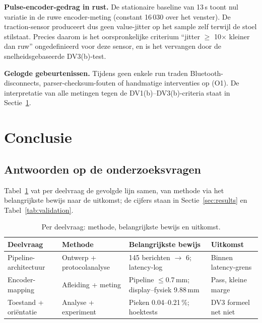 \documentclass[10pt, a4paper, twocolumn]{article}
\begin{document}
\textbf{Pulse-encoder-gedrag in rust.} De stationaire baseline van 13\,s toont
nul variatie in de ruwe encoder-meting (constant 16\,030 over het venster). De
traction-sensor produceert dus geen value-jitter op het sample zelf terwijl de
stoel stilstaat. Precies daarom is het oorspronkelijke criterium ``jitter
$\geq$ 10$\times$ kleiner dan ruw'' ongedefinieerd voor deze sensor, en is het
vervangen door de snelheidsgebaseerde DV3(b)-test.

\textbf{Gelogde gebeurtenissen.} Tijdens geen enkele run traden
Bluetooth-disconnects, parser-checksum-fouten of handmatige interventies op (O1).
De interpretatie van alle metingen tegen de DV1(b)--DV3(b)-criteria staat in
Sectie~\ref{sec:conclusion}.

\section{Conclusie}
\label{sec:conclusion}

\subsection{Antwoorden op de onderzoeksvragen}

Tabel~\ref{tab:traceability} vat per deelvraag de gevolgde lijn samen, van
methode via het belangrijkste bewijs naar de uitkomst; de cijfers staan in
Sectie~\ref{sec:results} en Tabel~\ref{tab:validation}.

\begin{table}[H]
\centering
\caption{Per deelvraag: methode, belangrijkste bewijs en uitkomst.}
\label{tab:traceability}
\small
\begin{tabular}{@{}p{1.8cm}p{1.5cm}p{2.6cm}p{1.4cm}@{}}
\toprule
\textbf{Deelvraag} & \textbf{Methode} & \textbf{Belangrijkste bewijs} & \textbf{Uitkomst} \\
\midrule
Pipeline-architectuur & Ontwerp + protocolanalyse & 145 berichten $\to$ 6; latency-log & Binnen latency-grens \\
Encoder-mapping & Afleiding + meting & Pipeline $\leq$0.7\,mm; display--fysiek 9.88\,mm & Pass, kleine marge \\
Toestand + oriëntatie & Analyse + experiment & Pieken 0.04--0.21\,\%; hoektests & DV3 formeel net niet \\
\bottomrule
\end{tabular}
\end{table}
\end{document}
